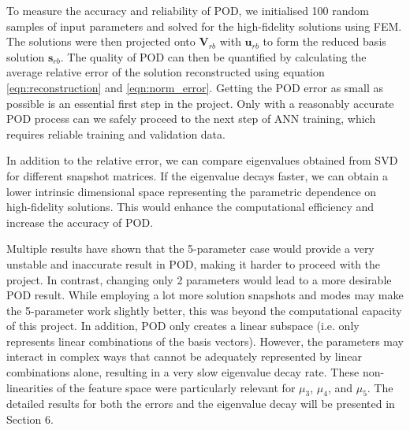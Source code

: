 To measure the accuracy and reliability of POD, we initialised 100 random samples of input parameters and solved for the high-fidelity solutions using FEM. The solutions were then projected onto $\mathbf{V}_{rb}$ with $\mathbf{u}_{rb}$ to form the reduced basis solution $\mathbf{s}_{rb}$. The quality of POD can then be quantified by calculating the average relative error of the solution reconstructed using equation \ref{eqn:reconstruction} and \ref{eqn:norm_error}. Getting the POD error as small as possible is an essential first step in the project. Only with a reasonably accurate POD process can we safely proceed to the next step of ANN training, which requires reliable training and validation data. 

In addition to the relative error, we can compare eigenvalues obtained from SVD for different snapshot matrices. If the eigenvalue decays faster, we can obtain a lower intrinsic dimensional space representing the parametric dependence on high-fidelity solutions. This would enhance the computational efficiency and increase the accuracy of POD.

Multiple results have shown that the 5-parameter case would provide a very unstable and inaccurate result in POD, making it harder to proceed with the project. In contrast, changing only 2 parameters would lead to a more desirable POD result. While employing a lot more solution snapshots and modes may make the 5-parameter work slightly better, this was beyond the computational capacity of this project. In addition, POD only creates a linear subspace (i.e. only represents linear combinations of the basis vectors). However, the parameters may interact in complex ways that cannot be adequately represented by linear combinations alone, resulting in a very slow eigenvalue decay rate. These non-linearities of the feature space were particularly relevant for $\mu_3$, $\mu_4$, and $\mu_5$. The detailed results for both the errors and the eigenvalue decay will be presented in Section 6. 

\newpage